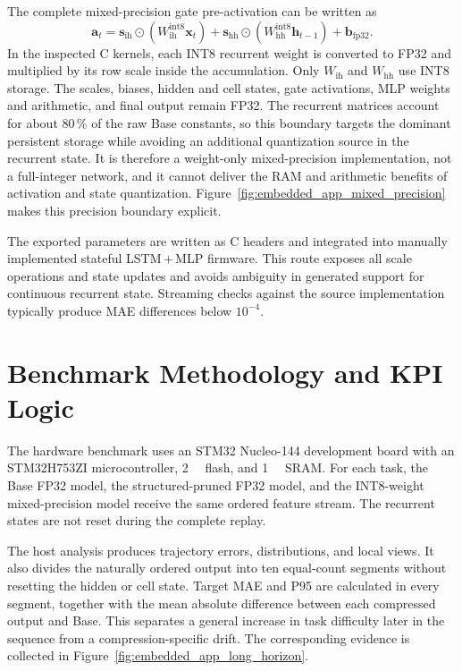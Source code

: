 \documentclass[
    a4paper,
    12pt,
    titlepage,
    bibliography=totoc,
    twoside=on,
    parskip=false,
    numbers=noenddot,
    cleardoublepage=empty,
    DIV=12,
    BCOR=12.0mm,
    headheight=36pt,
    headings=openright
]{scrreprt}
\begin{document}
The complete mixed-precision gate pre-activation can be written as
\begin{equation}
    \mathbf a_t=
    \mathbf s_{\mathrm{ih}}\odot
    \left(W_{\mathrm{ih}}^{\mathrm{int8}}\mathbf x_t\right)
    +\mathbf s_{\mathrm{hh}}\odot
    \left(W_{\mathrm{hh}}^{\mathrm{int8}}\mathbf h_{t-1}\right)
    +\mathbf b_{\mathrm{fp32}}.
    \label{eq:embedded_quant_gate}
\end{equation}
In the inspected C kernels, each INT8 recurrent weight is converted to FP32 and multiplied by its row scale inside the accumulation. Only $W_{\mathrm{ih}}$ and $W_{\mathrm{hh}}$ use INT8 storage. The scales, biases, hidden and cell states, gate activations, MLP weights and arithmetic, and final output remain FP32. The recurrent matrices account for about 80\,\% of the raw Base constants, so this boundary targets the dominant persistent storage while avoiding an additional quantization source in the recurrent state. It is therefore a weight-only mixed-precision implementation, not a full-integer network, and it cannot deliver the RAM and arithmetic benefits of activation and state quantization. Figure~\ref{fig:embedded_app_mixed_precision} makes this precision boundary explicit.

The exported parameters are written as C headers and integrated into manually implemented stateful LSTM\,+\,MLP firmware. This route exposes all scale operations and state updates and avoids ambiguity in generated support for continuous recurrent state.\autocite{ONNXRuntimeHighperformance,NVIDIATensorRTHighPerformance,XCUBEAISTM32CubeExpansion} Streaming checks against the source implementation typically produce MAE differences below $10^{-4}$.

\section{Benchmark Methodology and KPI Logic}
The hardware benchmark uses an STM32 Nucleo-144 development board with an STM32H753ZI microcontroller, \SI{2}{\mega\byte} flash, and \SI{1}{\mega\byte} SRAM.\autocite{STM32Nucleo144Boards2025_Datasheet,naguibMicroprocessorExecutionTime2022} For each task, the Base FP32 model, the structured-pruned FP32 model, and the INT8-weight mixed-precision model receive the same ordered feature stream. The recurrent states are not reset during the complete replay.

The host analysis produces trajectory errors, distributions, and local views. It also divides the naturally ordered output into ten equal-count segments without resetting the hidden or cell state. Target MAE and P95 are calculated in every segment, together with the mean absolute difference between each compressed output and Base. This separates a general increase in task difficulty later in the sequence from a compression-specific drift. The corresponding evidence is collected in Figure~\ref{fig:embedded_app_long_horizon}.
\end{document}
